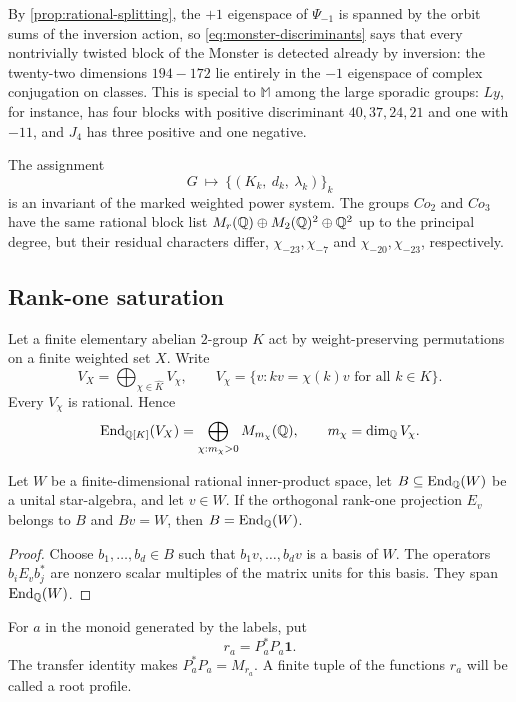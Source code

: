 By \cref{prop:rational-splitting}, the
\(+1\) eigenspace of \(\Psi_{-1}\) is spanned by the orbit sums of the
inversion action, so \eqref{eq:monster-discriminants} says that
every nontrivially twisted block of the Monster is detected already by
inversion: the twenty-two dimensions \(194-172\) lie entirely in the
\(-1\) eigenspace of complex conjugation on classes.  This is special to \(\mathbb M\) among the large
sporadic groups: \(Ly\), for instance, has four blocks with positive
discriminant \(40,37,24,21\) and one with \(-11\), and \(J_4\) has three
positive and one negative.

The assignment
\[
 G\ \longmapsto\ \bigl\{(K_k,\ d_k,\ \lambda_k)\bigr\}_{k}
\]
is an invariant of the marked weighted power system.  The groups \(Co_2\)
and \(Co_3\) have
the same rational block list \(M_r(\mathbb Q)\oplus M_2(\mathbb Q)^2\oplus\mathbb Q^2\) up to the
principal degree, but their residual characters differ, \(\chi_{-23},\chi_{-7}\)
and \(\chi_{-20},\chi_{-23}\), respectively.


\subsection{Rank-one saturation}
\label{sec:rank-one-saturation}

Let a finite elementary abelian \(2\)-group \(K\) act by weight-preserving
permutations on a finite weighted set \(X\).  Write
\[
 V_X=\bigoplus_{\chi\in\widehat K}V_\chi,
 \qquad
 V_\chi=\{v:kv=\chi(k)v\text{ for all }k\in K\}.
\]
Every \(V_\chi\) is rational.  Hence
\[
 \operatorname{End}_{\mathbb Q[K]}(V_X)=\bigoplus_{\chi:m_\chi>0}M_{m_\chi}(\mathbb Q),
 \qquad m_\chi=\dim_\mathbb Q V_\chi.
\]

\begin{lemma}
\label{lem:cyclic-rank-one}
Let \(W\) be a finite-dimensional rational inner-product space, let
\(B\subseteq\operatorname{End}_\mathbb Q(W)\) be a unital star-algebra, and let \(v\in W\).
If the orthogonal rank-one projection \(E_v\) belongs to \(B\) and
\(Bv=W\), then \(B=\operatorname{End}_\mathbb Q(W)\).
\end{lemma}

\begin{proof}
Choose \(b_1,\ldots,b_d\in B\) such that \(b_1v,\ldots,b_dv\) is a basis
of \(W\).  The operators \(b_iE_vb_j^*\) are nonzero scalar multiples of
the matrix units for this basis.  They span \(\operatorname{End}_\mathbb Q(W)\).
\end{proof}

For \(a\) in the monoid generated by the labels, put
\[
 r_a=P_a^*P_a\mathbf1.
\]
The transfer identity makes \(P_a^*P_a=M_{r_a}\).  A finite tuple of the
functions \(r_a\) will be called a root profile.

